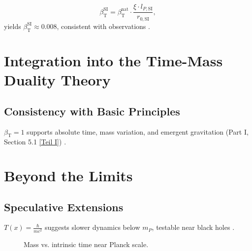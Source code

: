 \documentclass[twocolumn,aps,prl]{revtex4-2}
\newcommand{\Tfield}{T(x)}
\newcommand{\betaT}{\beta_{\text{T}}}
\begin{document}
	\begin{equation}
		\betaT^{\text{SI}} = \betaT^{\text{nat}} \cdot \frac{\xi \cdot l_{P,\text{SI}}}{r_{0,\text{SI}}},
		\label{eq:beta_conversion}
	\end{equation}
	yields \(\betaT^{\text{SI}} \approx 0.008\), consistent with observations \cite{pascher_alphabeta_2025}.
	
	\section{Integration into the Time-Mass Duality Theory}
	\label{sec:integration_t0}
	
	\subsection{Consistency with Basic Principles}
	\label{subsec:consistency_principles}
	
	\(\betaT = 1\) supports absolute time, mass variation, and emergent gravitation (Part I, Section 5.1 \href{https://github.com/jpascher/T0-Time-Mass-Duality/tree/main/2/pdf/English/Bridging Quantum Mechanics and Relativity through Time-Mass Duality Part I Theoretical Foundations_en.pdf}{[Teil I]}) \cite{pascher_lagrange_2025}.
	
	\section{Beyond the Limits}
	\label{sec:beyond_limits}
	
	\subsection{Speculative Extensions}
	\label{subsec:speculative_extensions}
	
	\(\Tfield = \frac{\hbar}{m c^2}\) suggests slower dynamics below \(m_P\), testable near black holes \cite{pascher_planck_2025}.
	
	\begin{figure}[ht]
		\centering
		\caption{Mass vs. intrinsic time near Planck scale.}
		\label{fig:mass_time}
	\end{figure}
	
\end{document}
